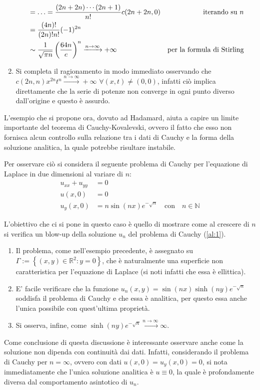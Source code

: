 \begin{example}
\begin{enumerate}
\begin{align*}
 &= \ldots = \frac{(2n+2n)\cdots(2n+1)}{n!}c(2n+2n,0) &\text{\quad iterando su } n\\
 &= \frac{(4n)!}{(2n)!n!} (-1)^{2n} \\
 &\sim \frac{1}{\sqrt{\pi n}}\left(\frac{64n}{e}\right)^n \xrightarrow{n\rightarrow\infty} +\infty  &\text{per la formula di Stirling}
\end{align*}
\item
Si completa il ragionamento in modo immediato osservando che 
$c(2n,n) x^{2n} t ^{n}\xrightarrow{n\rightarrow\infty} +\infty$ $\forall (x,t) \neq (0,0)$, 
infatti ciò implica direttamente che la serie di potenze non converge in ogni punto diverso dall'origine e questo è assurdo.
\end{enumerate}
\end{example}


\begin{example}
L'esempio che si propone ora, dovuto ad Hadamard, aiuta a capire un limite importante del teorema di Cauchy-Kovalevski, 
ovvero il fatto che esso non fornisca alcun controllo sulla relazione tra i dati di Cauchy e la forma della soluzione analitica, 
la quale potrebbe risultare instabile.

Per osservare ciò si considera il seguente problema di Cauchy per l'equazione di Laplace in due dimensioni al variare di $n$:
\begin{align}
\label{al:1}
u_{xx}+u_{yy}&=0\nonumber\\
u(x,0)&=0\\
u_y(x,0)&=n\sin(nx)e^{-\sqrt{n}} \quad \text{con} \quad n\in\mathbb{N}\nonumber
\end{align}

L'obiettivo che ci si pone in questo caso è quello di mostrare come al crescere di $n$ 
si verifica un blow-up della soluzione $u_n$ del problema di Cauchy (\ref{al:1}).
\begin{enumerate}[1.]
\item
Il problema, come nell'esempio precedente, è assegnato su $\Gamma:=\left\lbrace(x,y) \in \mathbb{R}^2:y=0\right\rbrace$, che è naturalmente una superficie non caratteristica per l'equazione di Laplace (si noti infatti che essa è ellittica).
\item
E' facile verificare che la funzione $u_n(x,y)=\sin(nx)\sinh(ny)e^{-\sqrt{n}}$ soddisfa il problema di Cauchy e che essa è analitica, per questo essa anche l'unica possibile con quest'ultima proprietà.
\item
Si osserva, infine, come $\sinh(ny)e^{-\sqrt{n}}\xrightarrow{n\rightarrow\infty} \infty$.
\end{enumerate}
Come conclusione di questa discussione è interessante osservare anche come la soluzione non dipenda con continuità dai dati. 
Infatti, considerando il problema di Cauchy per $n=\infty$, ovvero con dati $u(x,0)=u_y(x,0)=0$, si nota immediatamente che l'unica soluzione analitica è $u\equiv0$, la quale è profondamente diversa dal comportamento asintotico di $u_n$.

\end{example}

